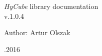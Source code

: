 \documentclass[a4paper,onecolumn,oneside,12pt]{mwrep}
\begin{document}
\begin{titlepage}	%
	
	\fontsize{24pt}{18pt}\selectfont
	\emph{HyCube} library documentation \\
	
	\fontsize{16pt}{14pt}\selectfont
	v.1.0.4
	\vspace*{25\baselineskip}
	
	
	\fontsize{14pt}{15pt}\selectfont
	Author: Artur Olszak\\
	\vspace*{1\baselineskip}
	
	
	\begin{flushright}
	\fontsize{10pt}{15pt}.2016
	\end{flushright}
	
\end{titlepage}





\newpage


\setcounter{page}{2}



\tableofcontents


\end{document}
